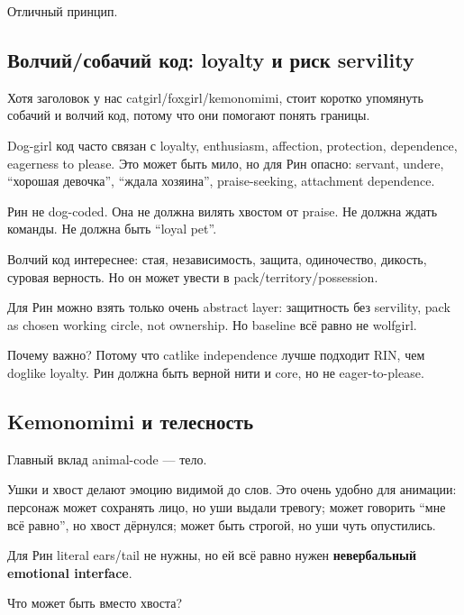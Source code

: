 Отличный принцип.

\subsection*{Волчий/\hspace{0pt}собачий код: loyalty и риск servility}

Хотя заголовок у нас catgirl/\hspace{0pt}foxgirl/\hspace{0pt}kemonomimi, стоит коротко упомянуть
собачий и волчий код, потому что они помогают понять границы.

Dog-girl код часто связан с loyalty, enthusiasm, affection, protection,
dependence, eagerness to please. Это может быть мило, но для Рин опасно:
servant, undere, ``хорошая девочка'', ``ждала хозяина'', praise-seeking,
attachment dependence.

Рин не dog-coded. Она не должна вилять хвостом от praise. Не должна
ждать команды. Не должна быть ``loyal pet''.

Волчий код интереснее: стая, независимость, защита, одиночество,
дикость, суровая верность. Но он может увести в
pack/\hspace{0pt}territory/\hspace{0pt}possession.

Для Рин можно взять только очень abstract layer: защитность без
servility, pack as chosen working circle, not ownership. Но baseline всё
равно не wolfgirl.

Почему важно? Потому что catlike independence лучше подходит RIN, чем
doglike loyalty. Рин должна быть верной нити и core, но не
eager-to-please.

\subsection*{Kemonomimi и телесность}

Главный вклад animal-code --- тело.

Ушки и хвост делают эмоцию видимой до слов. Это очень удобно для
анимации: персонаж может сохранять лицо, но уши выдали тревогу; может
говорить ``мне всё равно'', но хвост дёрнулся; может быть строгой, но
уши чуть опустились.

Для Рин literal ears/\hspace{0pt}tail не нужны, но ей всё равно нужен
\textbf{невербальный emotional interface}.

Что может быть вместо хвоста?

